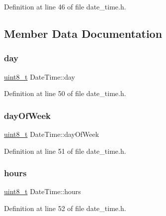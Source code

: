 Definition at line 46 of file date\+\_\+time.\+h.



\subsection{Member Data Documentation}
\mbox{\label{structDateTime_a727866b5ecdfda1edf946efe86aa74af}} 
\subsubsection{\texorpdfstring{day}{day}}
{\footnotesize\ttfamily \hyperlink{stdint_8h_aba7bc1797add20fe3efdf37ced1182c5}{uint8\+\_\+t} Date\+Time\+::day}



Definition at line 50 of file date\+\_\+time.\+h.

\mbox{\label{structDateTime_a4bcfa5ccbae6858247fce0ddc0fbc47c}} 
\subsubsection{\texorpdfstring{day\+Of\+Week}{dayOfWeek}}
{\footnotesize\ttfamily \hyperlink{stdint_8h_aba7bc1797add20fe3efdf37ced1182c5}{uint8\+\_\+t} Date\+Time\+::day\+Of\+Week}



Definition at line 51 of file date\+\_\+time.\+h.

\mbox{\label{structDateTime_a46fa4e0c13c7fc19c8ae97a5642c4a15}} 
\subsubsection{\texorpdfstring{hours}{hours}}
{\footnotesize\ttfamily \hyperlink{stdint_8h_aba7bc1797add20fe3efdf37ced1182c5}{uint8\+\_\+t} Date\+Time\+::hours}



Definition at line 52 of file date\+\_\+time.\+h.

\mbox{\label{structDateTime_a8b3982e7347da9a62c2bfc6c273da909}} 
